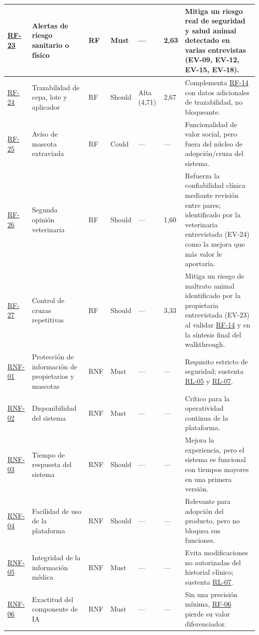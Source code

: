 \documentclass[journal,onecolumn]{IEEEtran}
\begin{document}
\begin{landscape}
\begin{longtable}{@{}p{1.2cm} p{5.2cm} p{1.0cm} p{1.3cm} p{1.3cm} p{1.1cm} p{6.5cm}@{}}
			\hyperref[tab:RF-23]{RF-23} & Alertas de riesgo sanitario o físico & RF & Must & --- & 2,63 & Mitiga un riesgo real de seguridad y salud animal detectado en varias entrevistas (EV-09, EV-12, EV-15, EV-18). \\ \midrule
			\hyperref[tab:RF-24]{RF-24} & Trazabilidad de cepa, lote y aplicador & RF & Should & Alta (4,71) & 2,67 & Complementa \hyperref[tab:RF-14]{RF-14} con datos adicionales de trazabilidad, no bloqueante. \\ \midrule
			\hyperref[tab:RF-25]{RF-25} & Aviso de mascota extraviada & RF & Could & --- & --- & Funcionalidad de valor social, pero fuera del núcleo de adopción/cruza del sistema. \\ \midrule
			\hyperref[tab:RF-26]{RF-26} & Segunda opinión veterinaria & RF & Should & --- & 1,60 & Refuerza la confiabilidad clínica mediante revisión entre pares; identificado por la veterinaria entrevistada (EV-24) como la mejora que más valor le aportaría. \\ \midrule
			\hyperref[tab:RF-27]{RF-27} & Control de cruzas repetitivas & RF & Should & --- & 3,33 & Mitiga un riesgo de maltrato animal identificado por la propietaria entrevistada (EV-23) al validar \hyperref[tab:RF-14]{RF-14} y en la síntesis final del walkthrough. \\ \midrule
			\hyperref[tab:RNF-01]{RNF-01} & Protección de información de propietarios y mascotas & RNF & Must & --- & --- & Requisito estricto de seguridad; sustenta \hyperref[rl:05]{RL-05} y \hyperref[rl:07]{RL-07}. \\ \midrule
			\hyperref[tab:RNF-02]{RNF-02} & Disponibilidad del sistema & RNF & Must & --- & --- & Crítico para la operatividad continua de la plataforma. \\ \midrule
			\hyperref[tab:RNF-03]{RNF-03} & Tiempo de respuesta del sistema & RNF & Should & --- & --- & Mejora la experiencia, pero el sistema es funcional con tiempos mayores en una primera versión. \\ \midrule
			\hyperref[tab:RNF-04]{RNF-04} & Facilidad de uso de la plataforma & RNF & Should & --- & --- & Relevante para adopción del producto, pero no bloquea sus funciones. \\ \midrule
			\hyperref[tab:RNF-05]{RNF-05} & Integridad de la información médica & RNF & Must & --- & --- & Evita modificaciones no autorizadas del historial clínico; sustenta \hyperref[rl:07]{RL-07}. \\ \midrule
			\hyperref[tab:RNF-06]{RNF-06} & Exactitud del componente de IA & RNF & Must & --- & --- & Sin una precisión mínima, \hyperref[tab:RF-06]{RF-06} pierde su valor diferenciador. \\ \midrule

\end{longtable}
\end{landscape}
\end{document}
